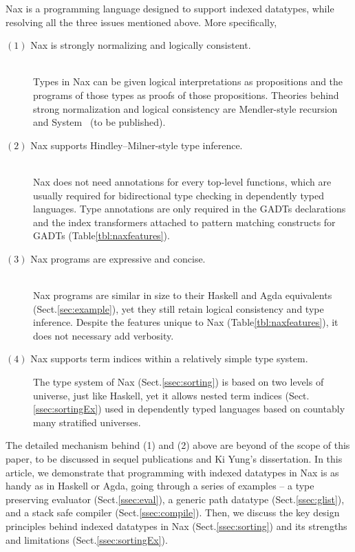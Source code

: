 Nax is a programming language designed to support indexed datatypes,
while resolving all the three issues mentioned above.
More specifically,
\begin{description}
\item[$(1)$ Nax is strongly normalizing and logically consistent.]~\\
Types in Nax can be given logical interpretations as propositions
and the programs of those types as proofs of those propositions.
Theories behind strong normalization and logical consistency are
Mendler-style recursion \cite{AhnShe11} and System \Fi\ (to be published).

\item[$(2)$ Nax supports Hindley--Milner-style type inference.]~\\
Nax does not need annotations for every top-level functions, which are usually
required for bidirectional type checking in dependently typed languages.
Type annotations are only required in the GADTs declarations and
the index transformers attached to pattern matching constructs for GADTs
(Table\;\ref{tbl:naxfeatures}).

\item[$(3)$ Nax programs are expressive and concise.]~\\
Nax programs are similar in size to their Haskell and Agda equivalents
(Sect.\;\ref{sec:example}), yet they still retain logical consistency
and type inference. Despite the features unique to Nax
(Table\;\ref{tbl:naxfeatures}), it does not necessary add verbosity.

\item[$(4)$ Nax supports term indices within a relatively simple type system.]
The type system of Nax (Sect.\;\ref{ssec:sorting}) is based on
two levels of universe, just like Haskell, yet it allows nested term indices
(Sect.\;\ref{ssec:sortingEx}) used in dependently typed languages based on
countably many stratified universes.
\end{description}
The detailed mechanism behind (1) and (2) above are beyond of the scope of
this paper, to be discussed in sequel publications and Ki Yung's dissertation.
In this article, we demonstrate that programming with indexed datatypes in Nax
is as handy as in Haskell or Agda, going through a series of examples --
a type preserving evaluator (Sect.\;\ref{ssec:eval}),
a generic path datatype (Sect.\;\ref{ssec:glist}), and
a stack safe compiler (Sect.\;\ref{ssec:compile}).
Then, we discuss the key design principles behind indexed datatypes in Nax
(Sect.\;\ref{ssec:sorting}) and its strengths and limitations
(Sect.\;\ref{ssec:sortingEx}).

